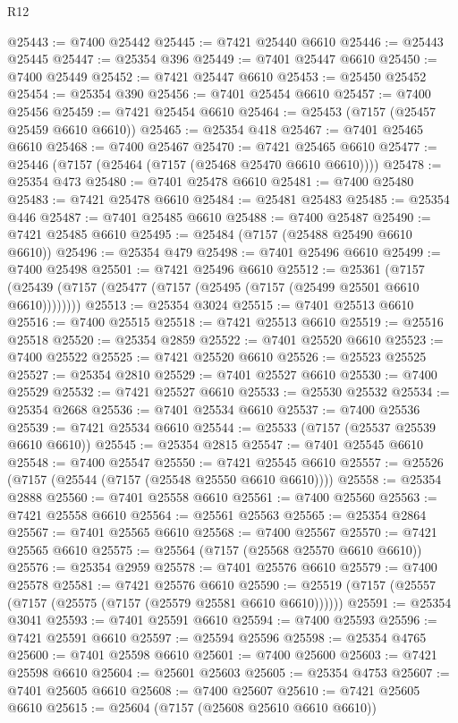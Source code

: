 \begin{lexlean}{R12}
\begin{coremodule}
{{{{{{{{{{{{{{{{{{{{{{{{{{{{{{{{{{{{{{{{{{{{{{{{{{{{{{{{{{{{{{{{{{{{{{{{{{{{{{{{{{@25443 := @7400 @25442
@25445 := @7421 @25440 @6610
@25446 := @25443 @25445
@25447 := @25354 @396
@25449 := @7401 @25447 @6610
@25450 := @7400 @25449
@25452 := @7421 @25447 @6610
@25453 := @25450 @25452
@25454 := @25354 @390
@25456 := @7401 @25454 @6610
@25457 := @7400 @25456
@25459 := @7421 @25454 @6610
@25464 := @25453 (@7157 (@25457 @25459 @6610 @6610))
@25465 := @25354 @418
@25467 := @7401 @25465 @6610
@25468 := @7400 @25467
@25470 := @7421 @25465 @6610
@25477 := @25446 (@7157 (@25464 (@7157 (@25468 @25470 @6610 @6610))))
@25478 := @25354 @473
@25480 := @7401 @25478 @6610
@25481 := @7400 @25480
@25483 := @7421 @25478 @6610
@25484 := @25481 @25483
@25485 := @25354 @446
@25487 := @7401 @25485 @6610
@25488 := @7400 @25487
@25490 := @7421 @25485 @6610
@25495 := @25484 (@7157 (@25488 @25490 @6610 @6610))
@25496 := @25354 @479
@25498 := @7401 @25496 @6610
@25499 := @7400 @25498
@25501 := @7421 @25496 @6610
@25512 := @25361
    (@7157 (@25439 (@7157 (@25477 (@7157 (@25495 (@7157 (@25499 @25501 @6610 @6610))))))))
@25513 := @25354 @3024
@25515 := @7401 @25513 @6610
@25516 := @7400 @25515
@25518 := @7421 @25513 @6610
@25519 := @25516 @25518
@25520 := @25354 @2859
@25522 := @7401 @25520 @6610
@25523 := @7400 @25522
@25525 := @7421 @25520 @6610
@25526 := @25523 @25525
@25527 := @25354 @2810
@25529 := @7401 @25527 @6610
@25530 := @7400 @25529
@25532 := @7421 @25527 @6610
@25533 := @25530 @25532
@25534 := @25354 @2668
@25536 := @7401 @25534 @6610
@25537 := @7400 @25536
@25539 := @7421 @25534 @6610
@25544 := @25533 (@7157 (@25537 @25539 @6610 @6610))
@25545 := @25354 @2815
@25547 := @7401 @25545 @6610
@25548 := @7400 @25547
@25550 := @7421 @25545 @6610
@25557 := @25526 (@7157 (@25544 (@7157 (@25548 @25550 @6610 @6610))))
@25558 := @25354 @2888
@25560 := @7401 @25558 @6610
@25561 := @7400 @25560
@25563 := @7421 @25558 @6610
@25564 := @25561 @25563
@25565 := @25354 @2864
@25567 := @7401 @25565 @6610
@25568 := @7400 @25567
@25570 := @7421 @25565 @6610
@25575 := @25564 (@7157 (@25568 @25570 @6610 @6610))
@25576 := @25354 @2959
@25578 := @7401 @25576 @6610
@25579 := @7400 @25578
@25581 := @7421 @25576 @6610
@25590 := @25519 (@7157 (@25557 (@7157 (@25575 (@7157 (@25579 @25581 @6610 @6610))))))
@25591 := @25354 @3041
@25593 := @7401 @25591 @6610
@25594 := @7400 @25593
@25596 := @7421 @25591 @6610
@25597 := @25594 @25596
@25598 := @25354 @4765
@25600 := @7401 @25598 @6610
@25601 := @7400 @25600
@25603 := @7421 @25598 @6610
@25604 := @25601 @25603
@25605 := @25354 @4753
@25607 := @7401 @25605 @6610
@25608 := @7400 @25607
@25610 := @7421 @25605 @6610
@25615 := @25604 (@7157 (@25608 @25610 @6610 @6610))
}}}}}}}}}}}}}}}}}}}}}}}}}}}}}}}}}}}}}}}}}}}}}}}}}}}}}}}}}}}}}}}}}}}}}}}}}}}}}}}}}}
\end{coremodule}
\end{lexlean}
